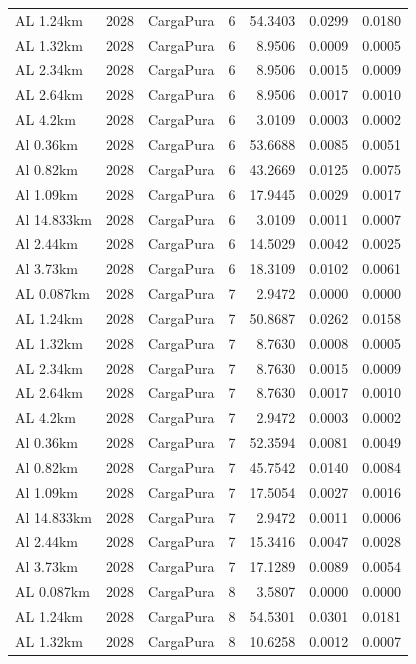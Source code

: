 \documentclass[11pt,a4paper]{article}
\begin{document}
\begin{longtable}{llllrrr}
AL 1.24km & 2028 & CargaPura & 6 & 54.3403 & 0.0299 & 0.0180 \\
AL 1.32km & 2028 & CargaPura & 6 & 8.9506 & 0.0009 & 0.0005 \\
AL 2.34km & 2028 & CargaPura & 6 & 8.9506 & 0.0015 & 0.0009 \\
AL 2.64km & 2028 & CargaPura & 6 & 8.9506 & 0.0017 & 0.0010 \\
AL 4.2km & 2028 & CargaPura & 6 & 3.0109 & 0.0003 & 0.0002 \\
Al 0.36km & 2028 & CargaPura & 6 & 53.6688 & 0.0085 & 0.0051 \\
Al 0.82km & 2028 & CargaPura & 6 & 43.2669 & 0.0125 & 0.0075 \\
Al 1.09km & 2028 & CargaPura & 6 & 17.9445 & 0.0029 & 0.0017 \\
Al 14.833km & 2028 & CargaPura & 6 & 3.0109 & 0.0011 & 0.0007 \\
Al 2.44km & 2028 & CargaPura & 6 & 14.5029 & 0.0042 & 0.0025 \\
Al 3.73km & 2028 & CargaPura & 6 & 18.3109 & 0.0102 & 0.0061 \\
AL 0.087km & 2028 & CargaPura & 7 & 2.9472 & 0.0000 & 0.0000 \\
AL 1.24km & 2028 & CargaPura & 7 & 50.8687 & 0.0262 & 0.0158 \\
AL 1.32km & 2028 & CargaPura & 7 & 8.7630 & 0.0008 & 0.0005 \\
AL 2.34km & 2028 & CargaPura & 7 & 8.7630 & 0.0015 & 0.0009 \\
AL 2.64km & 2028 & CargaPura & 7 & 8.7630 & 0.0017 & 0.0010 \\
AL 4.2km & 2028 & CargaPura & 7 & 2.9472 & 0.0003 & 0.0002 \\
Al 0.36km & 2028 & CargaPura & 7 & 52.3594 & 0.0081 & 0.0049 \\
Al 0.82km & 2028 & CargaPura & 7 & 45.7542 & 0.0140 & 0.0084 \\
Al 1.09km & 2028 & CargaPura & 7 & 17.5054 & 0.0027 & 0.0016 \\
Al 14.833km & 2028 & CargaPura & 7 & 2.9472 & 0.0011 & 0.0006 \\
Al 2.44km & 2028 & CargaPura & 7 & 15.3416 & 0.0047 & 0.0028 \\
Al 3.73km & 2028 & CargaPura & 7 & 17.1289 & 0.0089 & 0.0054 \\
AL 0.087km & 2028 & CargaPura & 8 & 3.5807 & 0.0000 & 0.0000 \\
AL 1.24km & 2028 & CargaPura & 8 & 54.5301 & 0.0301 & 0.0181 \\
AL 1.32km & 2028 & CargaPura & 8 & 10.6258 & 0.0012 & 0.0007 \\

\end{longtable}
\end{document}
